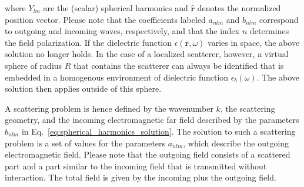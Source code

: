 \documentclass[10pt,letterpaper]{article}
\renewcommand{\vec}[1]{\mathbf{#1}}
\let\oldhat\hat
\renewcommand{\hat}[1]{\oldhat{\vec{#1}}}
\begin{document}
where $Y_{lm}$ are the (scalar) spherical harmonics and $\hat{r}$ denotes the normalized position vector. Please note that the coefficients labeled $a_{nlm}$ and $b_{nlm}$ correspond to outgoing and incoming waves, respectively, and that the index $n$ determines the field polarization. If the dielectric function $\epsilon(\vec{r},\omega)$ varies in space, the above solution no longer holds. In the case of a localized scatterer, however, a virtual sphere of radius $R$ that contains the scatterer can always be identified that is embedded in a homogenous environment of dielectric function $\epsilon_b(\omega)$. The above solution then applies outside of this sphere.

A scattering problem is hence defined by the wavenumber $k$, the scattering geometry, and the incoming electromagnetic far field described by the parameters $b_{nlm}$ in Eq.~\eqref{eq:spherical_harmonics_solution}. The solution to such a scattering problem is a set of values for the parameters $a_{nlm}$, which describe the outgoing electromagnetic field. Please note that the outgoing field consists of a scattered part and a part similar to the incoming field that is transmitted without interaction. The total field is given by the incoming plus the outgoing field.
\end{document}
